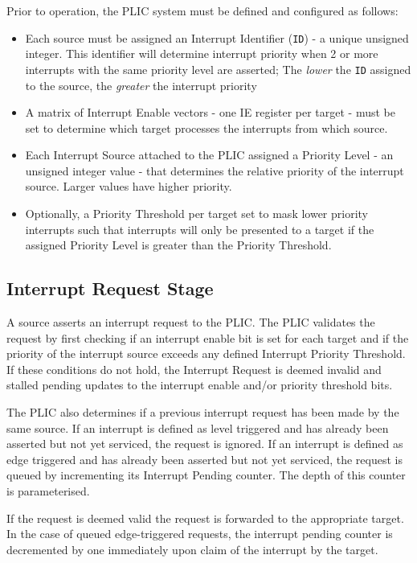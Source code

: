 Prior to operation, the PLIC system must be defined and configured as follows:

\begin{itemize}
	\item
		Each source must be assigned an Interrupt Identifier (\texttt{ID}) - a unique unsigned integer. This identifier will determine interrupt priority when 2 or more interrupts with the same priority level are asserted; The \emph{lower} the \texttt{ID} assigned to the source, the \emph{greater} the interrupt priority
	\item
		A matrix of Interrupt Enable vectors - one IE register per target - must be set to determine which target processes the interrupts from which source.
	\item
		Each Interrupt Source attached to the PLIC assigned a Priority Level - an unsigned integer value - that determines the relative priority of the interrupt source. Larger values have higher priority.
	\item
		Optionally, a Priority Threshold per target set to mask lower priority interrupts such that interrupts will only be presented to a target if the assigned Priority Level is greater than the Priority Threshold.
\end{itemize}

\subsection{Interrupt Request Stage}

A source asserts an interrupt request to the PLIC. The PLIC validates
the request by first checking if an interrupt enable bit is set for each
target and if the priority of the interrupt source exceeds any defined
Interrupt Priority Threshold. If these conditions do not hold, the
Interrupt Request is deemed invalid and stalled pending updates to the interrupt enable and/or priority threshold bits. 

The PLIC also determines if a previous interrupt request has been made by the same source.
If an interrupt is defined as level triggered and has already been asserted but not yet serviced, the request is ignored.
If an interrupt is defined as edge triggered and has already been asserted but not yet serviced, the request is queued by incrementing its Interrupt Pending counter.
The depth of this counter is parameterised.

If the request is deemed valid the request is forwarded to the
appropriate target. In the case of queued edge-triggered requests, the
interrupt pending counter is decremented by one immediately upon claim of the interrupt by the target.

